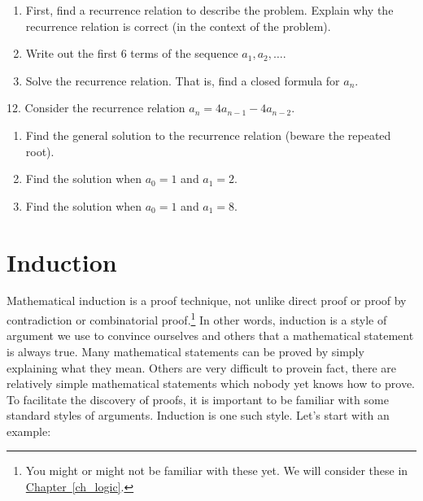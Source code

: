 \documentclass[10pt,]{book}
\theoremstyle{plain}
\theoremstyle{definition}
\theoremstyle{definition}
\theoremstyle{definition}
\theoremstyle{definition}
\numberwithin{equation}{chapter}
\begin{document}
\begin{exerciselist}
\leavevmode%
\begin{enumerate}[label=(\alph*)]
\item\hypertarget{li-191}{}\hypertarget{p-364}{}%
First, find a recurrence relation to describe the problem. Explain why the recurrence relation is correct (in the context of the problem). %
\item\hypertarget{li-192}{}\hypertarget{p-365}{}%
Write out the first 6 terms of the sequence \(a_1, a_2, \ldots\). %
\item\hypertarget{li-193}{}\hypertarget{p-366}{}%
Solve the recurrence relation. That is, find a closed formula for \(a_n\). %
\end{enumerate}
\par\smallskip
\item[12.]\hypertarget{exercise-44}{}\hypertarget{p-367}{}%
Consider the recurrence relation \(a_n = 4a_{n-1} - 4a_{n-2}\).%
\leavevmode%
\begin{enumerate}[label=(\alph*)]
\item\hypertarget{li-194}{}\hypertarget{p-368}{}%
Find the general solution to the recurrence relation (beware the repeated root). %
\item\hypertarget{li-195}{}\hypertarget{p-369}{}%
Find the solution when \(a_0 = 1\) and \(a_1 = 2\). %
\item\hypertarget{li-196}{}\hypertarget{p-370}{}%
Find the solution when \(a_0 = 1\) and \(a_1 = 8\). %
\end{enumerate}
\par\smallskip
\end{exerciselist}
\typeout{************************************************}
\typeout{************************************************}
\section[{Induction}]{Induction}\label{sec_seq-induction}
\hypertarget{p-371}{}%
 Mathematical induction is a proof technique, not unlike direct proof or proof by contradiction or combinatorial proof.\footnote{You might or might not be familiar with these yet.  We will consider these in \hyperref[ch_logic]{Chapter~\ref{ch_logic}}.\label{fn-3}} In other words, induction is a style of argument we use to convince ourselves and others that a mathematical statement is always true. Many mathematical statements can be proved by simply explaining what they mean. Others are very difficult to prove\textemdash{}in fact, there are relatively simple mathematical statements which nobody yet knows how to prove. To facilitate the discovery of proofs, it is important to be familiar with some standard styles of arguments. Induction is one such style. Let's start with an example:%
\typeout{************************************************}
\typeout{************************************************}
\end{document}
